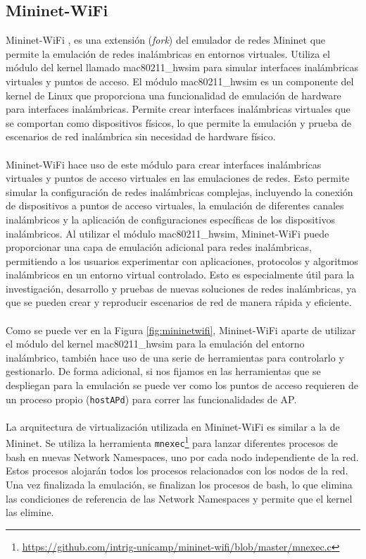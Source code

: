 \subsection{Mininet-WiFi}
\label{subsec:mininetWIFIS}
Mininet-WiFi \cite{7367387}, es una extensión (\textit{fork}) del emulador de redes Mininet que permite la emulación de redes inalámbricas en entornos virtuales. Utiliza el módulo del kernel llamado mac80211\_hwsim para simular interfaces inalámbricas virtuales y puntos de acceso. El módulo mac80211\_hwsim es un componente del kernel de Linux que proporciona una funcionalidad de emulación de hardware para interfaces inalámbricas. Permite crear interfaces inalámbricas virtuales que se comportan como dispositivos físicos, lo que permite la emulación y prueba de escenarios de red inalámbrica sin necesidad de hardware físico.\\
\\
Mininet-WiFi hace uso de este módulo para crear interfaces inalámbricas virtuales y puntos de acceso virtuales en las emulaciones de redes. Esto permite simular la configuración de redes inalámbricas complejas, incluyendo la conexión de dispositivos a puntos de acceso virtuales, la emulación de diferentes canales inalámbricos y la aplicación de configuraciones específicas de los dispositivos inalámbricos. Al utilizar el módulo mac80211\_hwsim, Mininet-WiFi puede proporcionar una capa de emulación adicional para redes inalámbricas, permitiendo a los usuarios experimentar con aplicaciones, protocolos y algoritmos inalámbricos en un entorno virtual controlado. Esto es especialmente útil para la investigación, desarrollo y pruebas de nuevas soluciones de redes inalámbricas, ya que se pueden crear y reproducir escenarios de red de manera rápida y eficiente.\\
\\
Como se puede ver en la Figura \ref{fig:mininetwifi}, Mininet-WiFi aparte de utilizar el módulo del kernel mac80211\_hwsim para la emulación del entorno inalámbrico, también hace uso de una serie de herramientas para controlarlo y gestionarlo. De forma adicional, si nos fijamos en las herramientas que se despliegan para la emulación se puede ver como los puntos de acceso requieren de un proceso propio (\texttt{hostAPd}) para correr las funcionalidades de AP.\\
\\
La arquitectura de virtualización utilizada en Mininet-WiFi es similar a la de Mininet. Se utiliza la herramienta \texttt{mnexec}\footnote{\url{https://github.com/intrig-unicamp/mininet-wifi/blob/master/mnexec.c}} para lanzar diferentes procesos de bash en nuevas Network Namespaces, uno por cada nodo independiente de la red. Estos procesos alojarán todos los procesos relacionados con los nodos de la red. Una vez finalizada la emulación, se finalizan los procesos de bash, lo que elimina las condiciones de referencia de las Network Namespaces y permite que el kernel las elimine.\\
